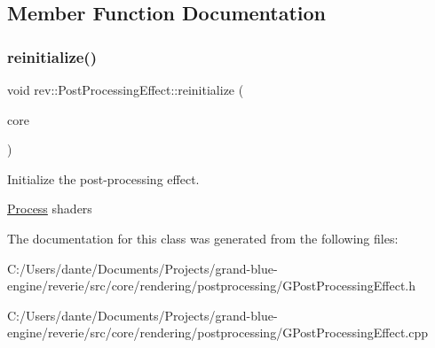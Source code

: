 \subsection{Member Function Documentation}
\mbox{\label{classrev_1_1_post_processing_effect_a0100bdd75fdafaa88df96f9dbd4cf760}} 
\subsubsection{\texorpdfstring{reinitialize()}{reinitialize()}}
{\footnotesize\ttfamily void rev\+::\+Post\+Processing\+Effect\+::reinitialize (\begin{DoxyParamCaption}\item[{\mbox{\hyperlink{classrev_1_1_core_engine}{Core\+Engine}} $\ast$}]{core }\end{DoxyParamCaption})}



Initialize the post-\/processing effect. 

\mbox{\hyperlink{classrev_1_1_process}{Process}} shaders 

The documentation for this class was generated from the following files\+:\begin{DoxyCompactItemize}
\item 
C\+:/\+Users/dante/\+Documents/\+Projects/grand-\/blue-\/engine/reverie/src/core/rendering/postprocessing/G\+Post\+Processing\+Effect.\+h\item 
C\+:/\+Users/dante/\+Documents/\+Projects/grand-\/blue-\/engine/reverie/src/core/rendering/postprocessing/G\+Post\+Processing\+Effect.\+cpp\end{DoxyCompactItemize}
